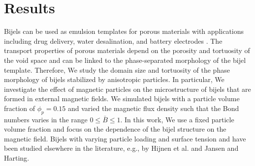 
\section{Results}\label{sec:results_p1}

Bijels can be used as emulsion templates for porous materials with
applications including drug delivery, water desalination, and battery
electrodes
\cite{vanoli_bijels_2022, chen_pore-scale_2022, lu_controllable_2020, garcia_scalable_2019}.
The transport properties of porous materials depend on the porosity and
tortuosity of the void space and can be linked to the phase-separated
morphology of the bijel template. Therefore, We study the domain size
and tortuosity of the phase morphology of bijels stabilized by
anisotropic particles. In particular, We investigate the effect of
magnetic particles on the microstructure of bijels that are formed in
external magnetic fields. We simulated bijels with a particle volume
fraction of \(\phi_p=0.15\) and varied the magnetic flux density such
that the Bond numbers varies in the range \(0\le\bar{B}\le1\).
In this work, We use a fixed particle volume fraction and focus on the dependence of the 
bijel structure on the magnetic field. Bijels with varying particle loading and surface tension 
and have been studied elsewhere in the literature, e.g., by Hijnen et al.\cite{hijnen_bijels_2015} 
and Jansen and Harting\cite{jansen_bijels_2011}.

